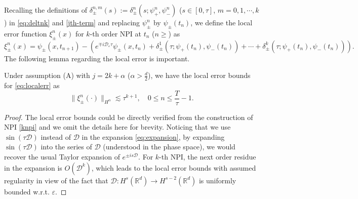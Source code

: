 \documentclass[final,leqno,showlabe]{siamltex}
\begin{document}
Recalling the definitions of $\delta_\pm^{n,m}(s):=\delta_\pm^n(s;\psi_+^n,\psi_-^n)$ ($s\in[0,\tau]$, $m=0,1,\cdots,k$) in \eqref{eq:deltnk} and \eqref{jth-term} and replacing $\psi_\pm^n$ by $\psi_\pm(t_n)$, we define the local error function $\xi_\pm^n(x)$ for $k$-th order NPI at $t_{n}$ ($n\ge$) as
\begin{equation}\label{eq:localerr}
\xi_\pm^n(x)=\psi_{\pm}(x,t_{n+1})-\left(e^{\mp i\mathcal{D}_\varepsilon \tau}\psi_\pm(x,t_n)+\delta_{\pm}^{1}(\tau;\psi_+(t_n),\psi_-(t_n))+\cdots+\delta_{\pm}^{k}(\tau;\psi_+(t_n),\psi_-(t_n))\right).
\end{equation}
 The following lemma regarding the local error is important.
\begin{lemma}\label{lm:local} Under assumption (A) with $j=2k+\alpha$ ($\alpha>\frac{d}{2}$), we have the local error bounds for \eqref{eq:localerr} as
\begin{equation}
\|\xi_\pm^n(\cdot)\|_{H^\alpha}\lesssim \tau^{k+1},\quad 0\leq n\leq \frac{T}{\tau}-1.
\end{equation}
\end{lemma}
\begin{proof} The local error bounds could be directly verified from the construction of NPI \eqref{knpi} and we omit the details here for brevity.  Noticing that we use $\sin(\tau\mathcal{D})$ instead of $\mathcal{D}$ in the expansion \eqref{eq:expansion}, by expanding $\sin(\tau\mathcal{D})$ into the series of $\mathcal{D}$ (understood in the phase space), we would recover the usual Taylor expansion of $e^{\pm is \mathcal{D}}$. For $k$-th  NPI, the next order residue in the expansion is  $O(\mathcal{D}^{k})$, which leads to the local error bounds with assumed regularity in view of the fact that $\mathcal{D}: H^s(\mathbb{R}^d)\to H^{s-2}(\mathbb{R}^d)$ is uniformly bounded w.r.t. $\varepsilon$.
\end{proof}
\end{document}
